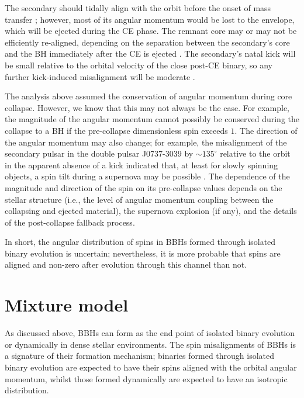 \documentclass[modern,linenumbers]{aastex61}
\begin{document}
The secondary should tidally align with the orbit before the onset of
mass transfer
\citep[e.g.,][]{2000ApJ...541..319K,2013PhRvD..87j4028G}; however,
most of its angular momentum would be lost to the envelope, which will
be ejected during the CE phase.  The remnant core may or may not be
efficiently re-aligned, depending on the separation between the
secondary's core and the BH immediately after the CE is ejected
\citep{2016MNRAS.462..844K}.  The secondary's natal kick will be small
relative to the orbital velocity of the close post-CE binary, so any
further kick-induced misalignment will be moderate
\citep{2016ApJ...832L...2R}.

The analysis above assumed the conservation of angular momentum during
core collapse. However, we know that this may not always be the case.
For example, the magnitude of the angular momentum cannot possibly be
conserved during the collapse to a BH if the pre-collapse
dimensionless spin exceeds $1$.  The direction of the angular momentum
may also change; for example, the misalignment of the secondary pulsar
in the double pulsar J0737-3039 by $\sim 135^{\circ}$ relative to
the orbit in the apparent absence of a kick indicated that, at least
for slowly spinning objects, a spin tilt during a supernova may be
possible \citep{2011ApJ...742...81F}.  The dependence of the magnitude
and direction of the spin on its pre-collapse values depends on the
stellar structure (i.e., the level of angular momentum coupling
between the collapsing and ejected material), the supernova explosion
(if any), and the details of the post-collapse fallback process.

In short, the angular distribution of spins in \acp{BBH} formed
through isolated binary evolution is uncertain; nevertheless, it is
more probable that spins are aligned and non-zero after evolution
through this channel than not.  


\appendix

\section{Mixture model}

As discussed above, BBHs can form as the end point of isolated binary evolution or dynamically in dense stellar environments. The spin misalignments of BBHs is a signature of their formation mechanism; binaries formed through isolated binary evolution are expected to have their spins aligned with the orbital angular momentum, whilst those formed dynamically are expected to have an isotropic distribution.
\end{document}
